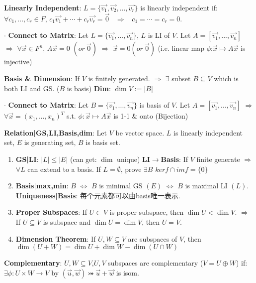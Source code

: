 \documentclass[9pt]{article}
\begin{document}
\textbf{Linearly Independent}: $L=\{\vec{v_1},\vec{v_2},...,\vec{v_r}\}$ is linearly independent if: \ $\forall c_1,...,c_r\in F$, $c_1\vec{v_1}+\cdots+c_r\vec{v_r}=\vec{0}$ \ $\Rightarrow$ \ $c_1=\cdots =c_r=0$.

$\cdot$ \textbf{Connect to Matrix}: {\footnotesize Let $L=\{\vec{v_1},...,\vec{v_n}\}$, $L$ is LI of $V$. Let $A=[\vec{v_1},...,\vec{v_n}]$ $\Rightarrow$ $\forall\vec{x}\in F^n$, $A\vec{x}=0$ $(or \ \vec{0})$ $\Rightarrow$ $\vec{x}=0 (or \ \vec{0})$ (i.e. linear map $\phi$:$\vec{x}\mapsto A\vec{x}$ is injective)}

\textbf{Basis \& Dimension}: If $V$ is finitely generated. $\Rightarrow$ $\exists$ subset $B\subseteq V$ which is both LI and GS. ($B$ is basis) \quad \textbf{Dim}: $\dim V:=|B|$

$\cdot$ \textbf{Connect to Matrix}: {\footnotesize Let $B=\{\vec{v_1},...,\vec{v_n}\}$ is basis of $V$. Let $A=[\vec{v_1},...,\vec{v_n}]$ $\Rightarrow$ $\forall\vec{x}=(x_1,...,x_n)^T$ s.t. $\phi:\vec{x}\mapsto A\vec{x}$ is 1-1 \& onto (Bijection)}

\textbf{Relation|GS,LI,Basis,dim}: {\small Let $V$ be vector space. $L$ is linearly independent set, $E$ is generating set, $B$ is basis set.}

\begin{enumerate}[itemsep=-2pt, topsep=-2pt]
    \item \textbf{GS|LI}: $|L|\leq|E|$ {\scriptsize (can get: $\dim$ unique)} \quad \textbf{LI$\to$Basis}: If $V$ finite generate $\Rightarrow$ $\forall L$ can extend to a basis. {\scriptsize If $L=\emptyset$, prove $\exists B$} \quad \quad $ker f\cap im f=\{0\}$
    \item \textbf{Basis|max,min}: $B$ $\Leftrightarrow$ $B$ is minimal GS $(E)$ $\Leftrightarrow$ $B$ is maximal LI $(L)$. \quad \textbf{Uniqueness|Basis}: {\small 每个元素都可以由basis唯一表示.}
    \item \textbf{Proper Subspaces}: {\small If $U\subset V$ is proper subspace, then $\dim U<\dim V$. \quad $\Rightarrow$ \quad If $U\subseteq V$ is subspace and $\dim U=\dim V$, then $U=V$.}
    \item \textbf{Dimension Theorem}: If $U,W\subseteq V$ are subspaces of $V$, then $\dim(U+W)=\dim U+\dim W-\dim(U\cap W)$
\end{enumerate}

\textbf{Complementary}: $U,W\subseteq V$,$U,V$ subspaces are complementary ($V=U\oplus W$) if: \quad $\exists\phi:U\times W\to V$ by $(\vec{u},\vec{w})\bij\vec{u}+\vec{w}$ is isom.
\end{document}
